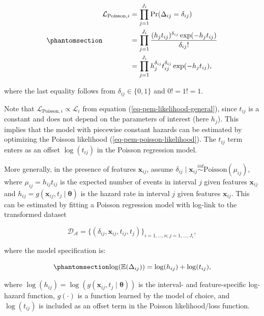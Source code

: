 \documentclass[
  letterpaper,
  krantz2]{style/krantz}
\begin{document}
\begin{equation}\phantomsection\label{eq-pem-poisson-likelihood}{
\begin{aligned}
\mathcal{L}_{\text{Poisson},i} 
& = \prod_{j=1}^{J_i} \Pr(\Delta_{ij} = \delta_{ij}) \\
&= \prod_{j=1}^{J_i} \frac{(h_j t_{ij})^{\delta_{ij}} \exp(-h_j t_{ij})}{\delta_{ij}!}\\
& = \prod_{j=1}^{J_i} h_j^{\delta_{ij}} t_{ij}^{\delta_{ij}}\exp(-h_j t_{ij}),
\end{aligned}
}\end{equation}

where the last equality follows from \(\delta_{ij} \in \{0,1\}\) and
\(0!=1!=1\).

Note that \(\mathcal{L}_{\text{Poisson}, i} \propto \mathcal{L}_i\) from
equation (\ref{eq-pem-likelihood-general}), since \(t_{ij}\) is a
constant and does not depend on the parameters of interest (here
\(h_j\)). This implies that the model with piecewise constant hazards
can be estimated by optimizing the Poisson likelihood
(\ref{eq-pem-poisson-likelihood}). The \(t_{ij}\) term enters as an
offset \(\log(t_{ij})\) in the Poisson regression model.

More generally, in the presence of features \(\mathbf{x}_{ij}\), assume
\(\delta_{ij} \mid \mathbf{x}_{ij} \stackrel{iid}{\sim} \text{Poisson}(\mu_{ij})\),
where \(\mu_{ij} = h_{ij} t_{ij}\) is the expected number of events in
interval \(j\) given features \(\mathbf{x}_{ij}\) and
\(h_{ij} = g(\mathbf{x}_{ij}, t_j\mid\boldsymbol{\theta})\) is the
hazard rate in interval \(j\) given features \(\mathbf{x}_{ij}\). This
can be estimated by fitting a Poisson regression model with log-link to
the transformed dataset

\[
\mathcal{D}_{\mathcal{A}} = \{(\delta_{ij}, \mathbf{x}_{ij}, t_{ij}, t_j)\}_{i=1,\ldots,n; j=1,\ldots,J_i},
\]

where the model specification is:

\begin{equation}\phantomsection\label{eq-pem-model}{
\log(\mathbb{E}(\Delta_{ij})) = \log(h_{ij}) + \log(t_{ij}),
}\end{equation}

where
\(\log(h_{ij}) =\log(g(\mathbf{x}_{ij}, t_j\mid\boldsymbol{\theta}))\)
is the interval- and feature-specific log-hazard function, \(g(\cdot)\)
is a function learned by the model of choice, and \(\log(t_{ij})\) is
included as an offset term in the Poisson likelihood/loss function.
\end{document}
